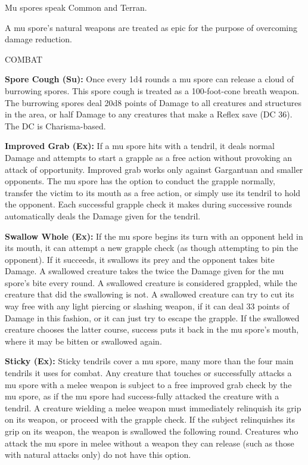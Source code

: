\documentclass{article}
\begin{document}
{Mu spores speak Common and Terran. 

A mu spore's natural weapons are treated as epic for the purpose of overcoming 
damage reduction.

COMBAT

\textbf{Spore Cough (Su):} Once every 1d4 rounds a mu spore can release a cloud 
of burrowing spores. This spore cough is treated as a 100-foot-cone breath weapon. 
The burrowing spores deal 20d8 points of Damage to all creatures and structures 
in the area, or half Damage to any creatures that make a Reflex save (DC 36). The 
DC is Charisma-based.

\textbf{Improved Grab (Ex):} If a mu spore hits with a tendril, it deals normal 
Damage and attempts to start a grapple as a free action without provoking an attack 
of opportunity. Improved grab works only against Gargantuan and smaller opponents. 
The mu spore has the option to conduct the grapple normally, transfer the victim 
to its mouth as a free action, or simply use its tendril to hold the opponent. 
Each successful grapple check it makes during successive rounds automatically deals 
the Damage given for the tendril. 

\textbf{Swallow Whole (Ex):} If the mu spore begins its turn with an opponent held 
in its mouth, it can attempt a new grapple check (as though attempting to pin the 
opponent). If it succeeds, it swallows its prey and the opponent takes bite Damage. 
A swallowed creature takes the twice the Damage given for the mu spore's bite every 
round. A swallowed creature is considered grappled, while the creature that did 
the swallowing is not. A swallowed creature can try to cut its way free with any 
light piercing or slashing weapon, if it can deal 33 points of Damage in this fashion, 
or it can just try to escape the grapple. If the swallowed creature chooses the 
latter course, success puts it back in the mu spore's mouth, where it may be bitten 
or swallowed again. 

\textbf{Sticky (Ex): }Sticky tendrils cover a mu spore, many more than the four 
main tendrils it uses for combat. Any creature that touches or successfully attacks 
a mu spore with a melee weapon is subject to a free improved grab check by the 
mu spore, as if the mu spore had success-fully attacked the creature with a tendril. 
A creature wielding a melee weapon must immediately relinquish its grip on its 
weapon, or proceed with the grapple check. If the subject relinquishes its grip 
on its weapon, the weapon is swallowed the following round. Creatures who attack 
the mu spore in melee without a weapon they can release (such as those with natural 
attacks only) do not have this option. 

}
\end{document}
